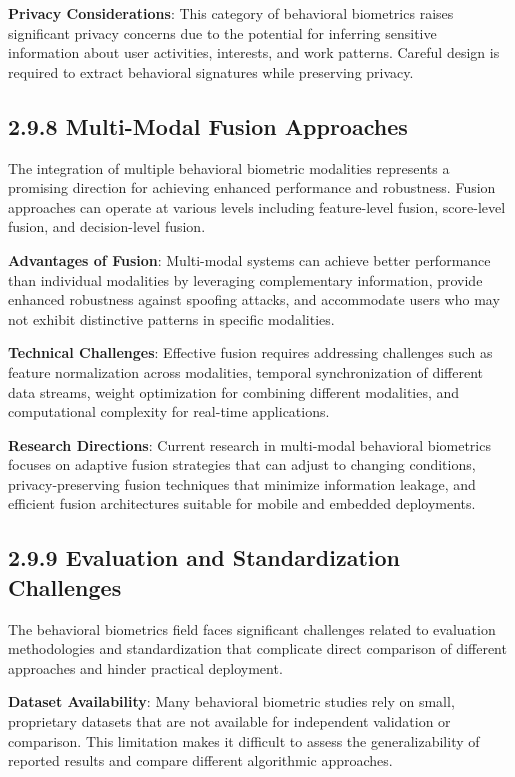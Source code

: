 \documentclass[
  12pt,
  a4paper,
]{report}
\begin{document}
\textbf{Privacy Considerations}: This category of behavioral biometrics
raises significant privacy concerns due to the potential for inferring
sensitive information about user activities, interests, and work
patterns. Careful design is required to extract behavioral signatures
while preserving privacy.

\subsection{2.9.8 Multi-Modal Fusion
Approaches}\label{multi-modal-fusion-approaches}

The integration of multiple behavioral biometric modalities represents a
promising direction for achieving enhanced performance and robustness.
Fusion approaches can operate at various levels including feature-level
fusion, score-level fusion, and decision-level fusion.

\textbf{Advantages of Fusion}: Multi-modal systems can achieve better
performance than individual modalities by leveraging complementary
information, provide enhanced robustness against spoofing attacks, and
accommodate users who may not exhibit distinctive patterns in specific
modalities.

\textbf{Technical Challenges}: Effective fusion requires addressing
challenges such as feature normalization across modalities, temporal
synchronization of different data streams, weight optimization for
combining different modalities, and computational complexity for
real-time applications.

\textbf{Research Directions}: Current research in multi-modal behavioral
biometrics focuses on adaptive fusion strategies that can adjust to
changing conditions, privacy-preserving fusion techniques that minimize
information leakage, and efficient fusion architectures suitable for
mobile and embedded deployments.

\subsection{2.9.9 Evaluation and Standardization
Challenges}\label{evaluation-and-standardization-challenges}

The behavioral biometrics field faces significant challenges related to
evaluation methodologies and standardization that complicate direct
comparison of different approaches and hinder practical deployment.

\textbf{Dataset Availability}: Many behavioral biometric studies rely on
small, proprietary datasets that are not available for independent
validation or comparison. This limitation makes it difficult to assess
the generalizability of reported results and compare different
algorithmic approaches.
\end{document}

